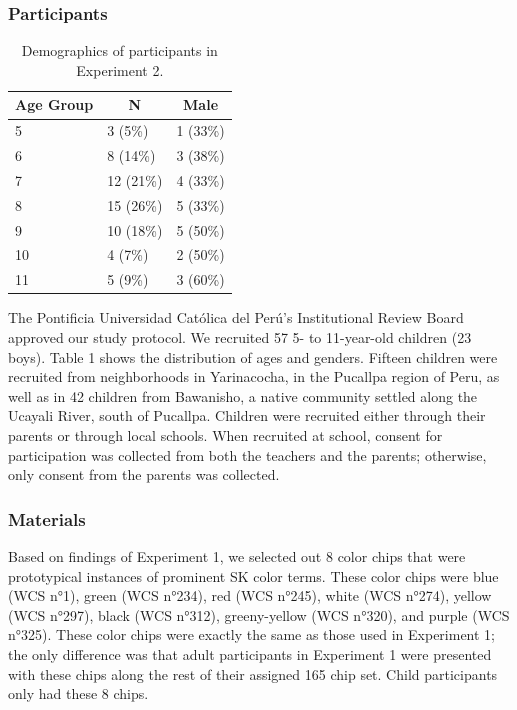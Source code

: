 \documentclass[,man,floatsintext]{apa6}
\theoremstyle{definition}
\theoremstyle{definition}
\theoremstyle{definition}
\theoremstyle{remark}
\begin{document}
\subsubsection{Participants}\label{participants-1}

\begin{table}[tbp]
\begin{center}
\begin{threeparttable}
\caption{\label{tab:unnamed-chunk-2}Demographics of participants in Experiment 2.}
\begin{tabular}{lll}
\toprule
Age Group & \multicolumn{1}{c}{N} & \multicolumn{1}{c}{Male}\\
\midrule
5 & 3 (5\%) & 1 (33\%)\\
6 & 8 (14\%) & 3 (38\%)\\
7 & 12 (21\%) & 4 (33\%)\\
8 & 15 (26\%) & 5 (33\%)\\
9 & 10 (18\%) & 5 (50\%)\\
10 & 4 (7\%) & 2 (50\%)\\
11 & 5 (9\%) & 3 (60\%)\\
\bottomrule
\end{tabular}
\end{threeparttable}
\end{center}
\end{table}

The Pontificia Universidad Católica del Perú's Institutional Review
Board approved our study protocol. We recruited 57 5- to 11-year-old
children (23 boys). Table 1 shows the distribution of ages and genders.
Fifteen children were recruited from neighborhoods in Yarinacocha, in
the Pucallpa region of Peru, as well as in 42 children from Bawanisho, a
native community settled along the Ucayali River, south of Pucallpa.
Children were recruited either through their parents or through local
schools. When recruited at school, consent for participation was
collected from both the teachers and the parents; otherwise, only
consent from the parents was collected.

\subsubsection{Materials}\label{materials-1}

Based on findings of Experiment 1, we selected out 8 color chips that
were prototypical instances of prominent SK color terms. These color
chips were blue (WCS n°1), green (WCS n°234), red (WCS n°245), white
(WCS n°274), yellow (WCS n°297), black (WCS n°312), greeny-yellow (WCS
n°320), and purple (WCS n°325). These color chips were exactly the same
as those used in Experiment 1; the only difference was that adult
participants in Experiment 1 were presented with these chips along the
rest of their assigned 165 chip set. Child participants only had these 8
chips.
\end{document}
